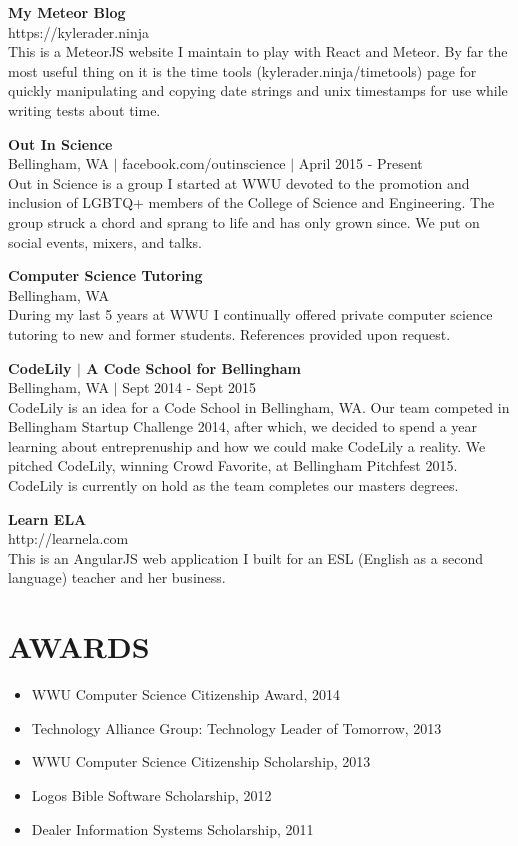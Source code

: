 \documentclass[line,margin]{res}
\begin{document}
\begin{resume}
    {\bf My Meteor Blog} \\
    {\footnotesize https://kylerader.ninja} \\
    This is a MeteorJS website I maintain to play with React and Meteor.  By far the most useful thing on it
    is the time tools (kylerader.ninja/timetools) page for quickly manipulating and copying date strings and unix timestamps for use while
    writing tests about time.

    {\bf Out In Science} \\
    {\footnotesize Bellingham, WA $|$ facebook.com/outinscience $|$ April 2015 - Present} \\
    Out in Science is a group I started at WWU devoted to the promotion and inclusion of LGBTQ+ members of the College of Science and Engineering.
    The group struck a chord and sprang to life and has only grown since.  We put on social events, mixers, and talks.

    {\bf Computer Science Tutoring} \\
    {\footnotesize Bellingham, WA} \\
    During my last 5 years at WWU I continually offered private computer science tutoring to new and former students. References provided upon request.

    {\bf CodeLily $|$ A Code School for Bellingham} \\
    {\footnotesize Bellingham, WA $|$ Sept 2014 - Sept 2015} \\
    CodeLily is an idea for a Code School in Bellingham, WA.  Our team competed in Bellingham Startup Challenge 2014, after which, we decided to spend a year learning about entreprenuship and how we could make CodeLily a reality.  We pitched CodeLily, winning Crowd Favorite, at Bellingham Pitchfest 2015.  CodeLily is currently on hold as the team completes our masters degrees.

    {\bf Learn ELA} \\
    {\footnotesize http://learnela.com} \\
    This is an AngularJS web application I built for an ESL  (English as a second language) teacher and her business.

\section{AWARDS}
    \begin{itemize} \itemsep -3pt
        \item WWU Computer Science Citizenship Award, 2014
        \item Technology Alliance Group: Technology Leader of Tomorrow, 2013
        \item WWU Computer Science Citizenship Scholarship, 2013
        \item Logos Bible Software Scholarship, 2012
        \item Dealer Information Systems Scholarship, 2011
    \end{itemize}


\end{resume}
\end{document}
